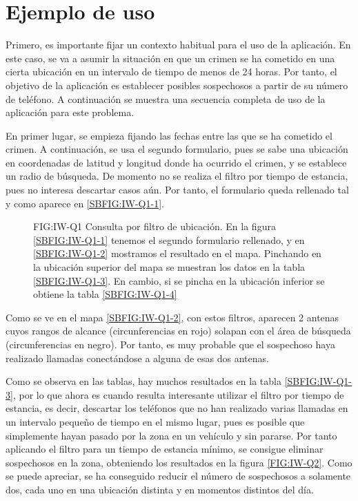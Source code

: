   \section{Ejemplo de uso}
    Primero, es importante fijar un contexto habitual para el uso de la aplicación. En este caso, se va a asumir la situación en que un crimen se ha cometido en una cierta ubicación en un intervalo de tiempo de menos de 24 horas. Por tanto, el objetivo de la aplicación es establecer posibles sospechosos a partir de su número de teléfono.
    A continuación se muestra una secuencia completa de uso de la aplicación para este problema.
    
    En primer lugar, se empieza fijando las fechas entre las que se ha cometido el crimen. A continuación, se usa el segundo formulario, pues se sabe una ubicación en coordenadas de latitud y longitud donde ha ocurrido el crimen, y se establece un radio de búsqueda. De momento no se realiza el filtro por tiempo de estancia, pues no interesa descartar casos aún. Por tanto, el formulario queda rellenado tal y como aparece en \ref{SBFIG:IW-Q1-1}.
    
    \begin{figure}[Consulta por filtro de ubicación]{FIG:IW-Q1}
      {Consulta por filtro de ubicación. En la figura \ref{SBFIG:IW-Q1-1} tenemos el segundo formulario rellenado, y en \ref{SBFIG:IW-Q1-2} mostramos el resultado en el mapa. Pinchando en la ubicación superior del mapa se muestran los datos en la tabla \ref{SBFIG:IW-Q1-3}. En cambio, si se pincha en la ubicación inferior se obtiene la tabla \ref{SBFIG:IW-Q1-4}}
      \quad
      \quad
      \quad
    \end{figure}
  
    Como se ve en el mapa \ref{SBFIG:IW-Q1-2}, con estos filtros, aparecen 2 antenas cuyos rangos de alcance (circunferencias en rojo) solapan con el área de búsqueda (circunferencias en negro). Por tanto, es muy probable que el sospechoso haya realizado llamadas conectándose a alguna de esas dos antenas.
    
    Como se observa en las tablas, hay muchos resultados en la tabla \ref{SBFIG:IW-Q1-3}, por lo que ahora es cuando resulta interesante utilizar el filtro por tiempo de estancia, es decir, descartar los teléfonos que no han realizado varias llamadas en un intervalo pequeño de tiempo en el mismo lugar, pues es posible que simplemente hayan pasado por la zona en un vehículo y sin pararse. 
    Por tanto aplicando el filtro para un tiempo de estancia mínimo, se consigue eliminar sospechosos en la zona, obteniendo los resultados en la figura \ref{FIG:IW-Q2}. 
    Como se puede apreciar, se ha conseguido reducir el número de sospechosos a solamente dos, cada uno en una ubicación distinta y en momentos distintos del día.
    
